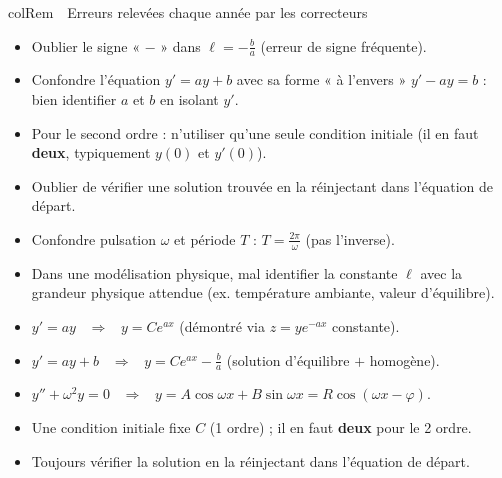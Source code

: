 \documentclass[11pt,a4paper]{article}
\newenvironment{remarque}[1][Remarque]
  {\begin{fiche}{colRem}{\ding{43}~~#1}}{\end{fiche}}
\begin{document}
\begin{remarque}[Erreurs relevées chaque année par les correcteurs]
\begin{itemize}[leftmargin=6mm, itemsep=0.5mm]
  \item Oublier le signe « $-$ » dans $\ell=-\frac ba$ (erreur de signe fréquente).
  \item Confondre l'équation $y'=ay+b$ avec sa forme « à l'envers » $y'-ay=b$ : bien identifier $a$ et $b$ en isolant $y'$.
  \item Pour le second ordre : n'utiliser qu'une seule condition initiale (il en faut \textbf{deux}, typiquement $y(0)$ et $y'(0)$).
  \item Oublier de vérifier une solution trouvée en la réinjectant dans l'équation de départ.
  \item Confondre pulsation $\omega$ et période $T$ : $T=\frac{2\pi}{\omega}$ (pas l'inverse).
  \item Dans une modélisation physique, mal identifier la constante $\ell$ avec la grandeur physique attendue (ex. température ambiante, valeur d'équilibre).
\end{itemize}
\end{remarque}

\vspace{4mm}
\begin{tcolorbox}[
  enhanced, boxrule=0pt, arc=2mm,
  interior style={left color=qtealdark, right color=qteal},
  left=6mm, right=6mm, top=4mm, bottom=4mm,
  fontupper=\color{white}\sffamily,
  title={\sffamily\bfseries\color{white}\ding{72}~~À retenir},
  colbacktitle=qtealdark, coltitle=white, boxrule=0pt
]
\begin{itemize}[leftmargin=6mm, label={\color{qamber}}, itemsep=1mm]
  \item $y'=ay$ \ $\Rightarrow$ \ $y=Ce^{ax}$ (démontré via $z=ye^{-ax}$ constante).
  \item $y'=ay+b$ \ $\Rightarrow$ \ $y=Ce^{ax}-\frac ba$ (solution d'équilibre $+$ homogène).
  \item $y''+\omega^2y=0$ \ $\Rightarrow$ \ $y=A\cos\omega x+B\sin\omega x=R\cos(\omega x-\varphi)$.
  \item Une condition initiale fixe $C$ (1 ordre) ; il en faut \textbf{deux} pour le 2 ordre.
  \item Toujours vérifier la solution en la réinjectant dans l'équation de départ.
\end{itemize}
\end{tcolorbox}
\end{document}
